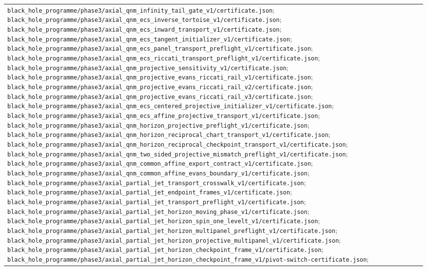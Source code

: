 \documentclass[11pt]{article}
\theoremstyle{definition}
\theoremstyle{remark}
\newcommand{\cert}[1]{\nolinkurl{#1}}
\begin{document}
{\begin{longtable}{@{}p{}p{}@{}}
\cert{black_hole_programme/phase3/axial_qnm_infinity_tail_gate_v1/certificate.json};
\cert{black_hole_programme/phase3/axial_qnm_ecs_inverse_tortoise_v1/certificate.json};
\cert{black_hole_programme/phase3/axial_qnm_ecs_inward_transport_v1/certificate.json};
\cert{black_hole_programme/phase3/axial_qnm_ecs_tangent_initializer_v1/certificate.json};
\cert{black_hole_programme/phase3/axial_qnm_ecs_panel_transport_preflight_v1/certificate.json};
\cert{black_hole_programme/phase3/axial_qnm_ecs_riccati_transport_preflight_v1/certificate.json};
\cert{black_hole_programme/phase3/axial_qnm_projective_sensitivity_v1/certificate.json};
\cert{black_hole_programme/phase3/axial_qnm_projective_evans_riccati_rail_v1/certificate.json};
\cert{black_hole_programme/phase3/axial_qnm_projective_evans_riccati_rail_v2/certificate.json};
\cert{black_hole_programme/phase3/axial_qnm_projective_evans_riccati_rail_v3/certificate.json};
\cert{black_hole_programme/phase3/axial_qnm_ecs_centered_projective_initializer_v1/certificate.json};
\cert{black_hole_programme/phase3/axial_qnm_ecs_affine_projective_transport_v1/certificate.json};
\cert{black_hole_programme/phase3/axial_qnm_horizon_projective_preflight_v1/certificate.json};
\cert{black_hole_programme/phase3/axial_qnm_horizon_reciprocal_chart_transport_v1/certificate.json};
\cert{black_hole_programme/phase3/axial_qnm_horizon_reciprocal_checkpoint_transport_v1/certificate.json};
\cert{black_hole_programme/phase3/axial_qnm_two_sided_projective_mismatch_preflight_v1/certificate.json};
\cert{black_hole_programme/phase3/axial_qnm_common_affine_export_contract_v1/certificate.json};
\cert{black_hole_programme/phase3/axial_qnm_common_affine_evans_boundary_v1/certificate.json};
\cert{black_hole_programme/phase3/axial_partial_jet_transport_crosswalk_v1/certificate.json};
\cert{black_hole_programme/phase3/axial_partial_jet_endpoint_frames_v1/certificate.json};
\cert{black_hole_programme/phase3/axial_partial_jet_transport_preflight_v1/certificate.json};
\cert{black_hole_programme/phase3/axial_partial_jet_horizon_moving_phase_v1/certificate.json};
\cert{black_hole_programme/phase3/axial_partial_jet_horizon_spin_one_levelt_v1/certificate.json};
\cert{black_hole_programme/phase3/axial_partial_jet_horizon_multipanel_preflight_v1/certificate.json};
\cert{black_hole_programme/phase3/axial_partial_jet_horizon_projective_multipanel_v1/certificate.json};
\cert{black_hole_programme/phase3/axial_partial_jet_horizon_checkpoint_frame_v1/certificate.json};
\cert{black_hole_programme/phase3/axial_partial_jet_horizon_checkpoint_frame_v1/pivot-switch-certificate.json};

\end{longtable}}
\end{document}
